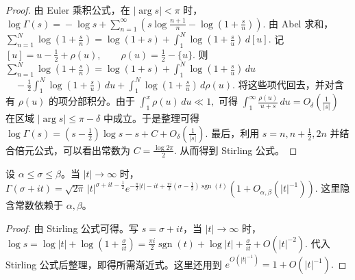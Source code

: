 \begin{proof}
	由 Euler 乘积公式，在 $|\arg s|<\pi$ 时，
	\(\textstyle \log\Gamma(s) =\allowbreak{} -\log s+\allowbreak{} \sum_{n=\allowbreak{}1}^\infty \left( s\log\frac{n+\allowbreak{}1}{n} -\log\left(1+\allowbreak{}\frac{s}{n}\right) \right).\)
	由 Abel 求和，
	\(\textstyle \sum_{n=\allowbreak{}1}^{N}\log\left(1+\allowbreak{}\frac{s}{n}\right) =\allowbreak{} \log(1+\allowbreak{}s) +\allowbreak{} \int_1^N\log\left(1+\allowbreak{}\frac{s}{u}\right)\,d[u].\)
	记
	\(\textstyle [u]=\allowbreak{}u-\frac12+\allowbreak{}\rho(u),\allowbreak{} \qquad \rho(u)=\allowbreak{}\frac12-\{u\}.\)
	则
	\(\textstyle \sum_{n=\allowbreak{}1}^{N}\log\left(1+\allowbreak{}\frac{s}{n}\right) =\allowbreak{} \log(1+\allowbreak{}s) +\allowbreak{} \int_1^N\log\left(1+\allowbreak{}\frac{s}{u}\right)\,du\) \(\textstyle \quad -\frac12\int_1^N\log\left(1+\allowbreak{}\frac{s}{u}\right)\,du +\allowbreak{} \int_1^N\log\left(1+\allowbreak{}\frac{s}{u}\right)\,d\rho(u).\)
	将这些项代回去，并对含有 $\rho(u)$ 的项分部积分。由于
	\(\textstyle \int_1^x \rho(u)\,du\ll1,\allowbreak{}\)
	可得
	\(\textstyle \int_1^\infty \frac{\rho(u)}{u+\allowbreak{}s}\,du =\allowbreak{} O_\delta\left(\frac1{|s|}\right)\)
	在区域 $|\arg s|\leq \pi-\delta$ 中成立。于是整理可得
	\(\textstyle \log\Gamma(s) =\allowbreak{} \left(s-\frac12\right)\log s -s+\allowbreak{}C +\allowbreak{}O_\delta\left(\frac1{|s|}\right).\)
	最后，利用 $s=n,n+\frac12,2n$ 并结合倍元公式，可以看出常数为
	\(\textstyle C=\allowbreak{}\frac{\log 2\pi}{2}.\)
	从而得到 Stirling 公式。
\end{proof}

\begin{corollary}[原文 Corollary 7.8]
	设 $\alpha\leq \sigma\leq \beta$。当 $|t|\to\infty$ 时，
	\(\textstyle \Gamma(\sigma+\allowbreak{}it) =\allowbreak{} \sqrt{2\pi}\, |t|^{\sigma+\allowbreak{}it-\frac12} e^{-\frac{\pi}{2}|t|-it+\allowbreak{}\frac{\pi i}{2}(\sigma-\frac12)\operatorname{sgn}(t)} \left(1+\allowbreak{}O_{\alpha,\allowbreak{}\beta}\left(|t|^{-1}\right)\right).\)
	这里隐含常数依赖于 $\alpha,\beta$。
\end{corollary}

\begin{proof}
	由 Stirling 公式可得。写 $s=\sigma+it$，当 $|t|\to\infty$ 时，
	\(\textstyle \log s=\allowbreak{}\log |t|+\allowbreak{}\log\left(1+\allowbreak{}\frac{\sigma}{it}\right) =\allowbreak{} \frac{\pi i}{2}\operatorname{sgn}(t) +\allowbreak{}\log |t|+\allowbreak{}\frac{\sigma}{it} +\allowbreak{}O\left(|t|^{-2}\right).\)
	代入 Stirling 公式后整理，即得所需渐近式。这里还用到
	\(\textstyle e^{O(|t|^{-1})}=\allowbreak{}1+\allowbreak{}O(|t|^{-1}).\)
\end{proof}

